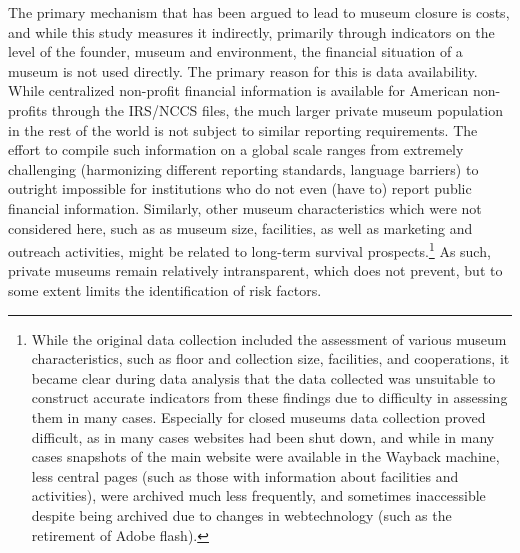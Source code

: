 \documentclass[12pt]{article}
\begin{document}
The primary mechanism that has been argued to lead to museum closure is costs, and while this study measures it indirectly, primarily through indicators on the level of the founder, museum and environment, the financial situation of a museum is not used directly.
The primary reason for this is data availability.
While centralized non-profit financial information is available for American non-profits through the IRS/NCCS files, the much larger private museum population in the rest of the world is not subject to similar reporting requirements.
The effort to compile such information on a global scale ranges from extremely challenging (harmonizing different reporting standards, language barriers) to outright impossible for institutions who do not even (have to) report public financial information.
Similarly, other museum characteristics which were not considered here, such as as museum size, facilities, as well as marketing and outreach activities, might be related to long-term survival prospects.\footnote{While the original data collection included the assessment of various museum characteristics, such as floor and collection size, facilities, and cooperations, it became clear during data analysis that the data collected was unsuitable to construct accurate indicators from these findings due to difficulty in assessing them in many cases.
Especially for closed museums data collection proved difficult, as in many cases websites had been shut down, and while in many cases snapshots of the main website were available in the Wayback machine, less central pages (such as those with information about facilities and activities), were archived much less frequently, and sometimes inaccessible despite being archived due to changes in webtechnology (such as the retirement of Adobe flash).}
As such, private museums remain relatively intransparent, which does not prevent, but to some extent limits the identification of risk factors. 
\end{document}
